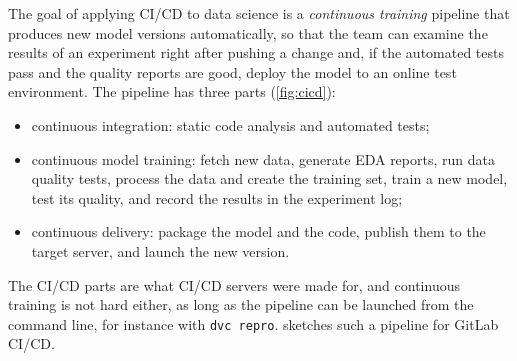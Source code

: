 The goal of applying CI/CD to data science is a \emph{continuous training} pipeline that produces new model
versions automatically, so that the team can examine the results of an experiment right after pushing a
change and, if the automated tests pass and the quality reports are good, deploy the model to an online
test environment. The pipeline has three parts (\cref{fig:cicd}): \begin{itemize}
\item continuous integration: static code
analysis and automated tests;
\item continuous model training: fetch new data, generate EDA reports, run data
quality tests, process the data and create the training set, train a new model, test its quality, and
record the results in the experiment log;
\item continuous delivery: package the model and the code, publish
them to the target server, and launch the new version.
\end{itemize} The CI/CD parts are what CI/CD servers were made
for, and continuous training is not hard either, as long as the pipeline can be launched from the command
line, for instance with \texttt{dvc repro}.  sketches such a pipeline for GitLab CI/CD.

